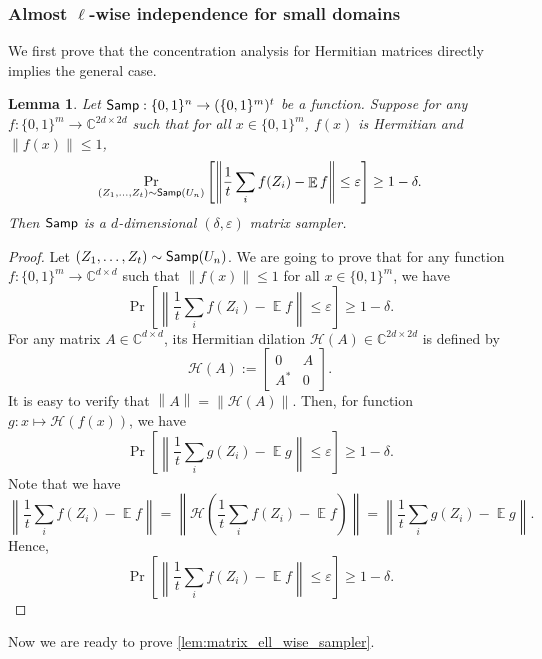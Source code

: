 \documentclass[10pt,a4paper]{article}
\newtheorem{lemma}[theorem]{Lemma}
\newcommand{\C}{\mathbb{C}}
\DeclareMathOperator*{\E}{\mathbb{E}}
\newcommand{\eps}{\varepsilon}
\newcommand{\1}{\mathbbm{1}}
\newcommand{\norm}[1]{\left\lVert #1\right\rVert}
\newcommand{\tuple}[1]{\left(#1\right)}
\newcommand{\zo}{\{0, 1\}}
\newcommand{\Smp}{\textup{\textsf{Samp}}}
\begin{document}
\subsubsection{Almost $\ell$-wise independence for small domains}
We first prove that the concentration analysis for Hermitian matrices directly implies the general case.
\begin{lemma}    \label{lem:Hermitian_implies_general}
    Let $\Smp: \zo^n \to (\zo^m)^t$ be a function. Suppose for any $f: \zo^m \to \C^{2d\times 2d}$ such that for all $x \in \zo^m$, $f(x)$ is Hermitian and $\|f(x)\| \le 1$,     \[
    \Pr_{(Z_1, \dots, Z_t) \sim \Smp(U_n)}
    \left[ \norm{\frac{1}{t}  \sum_i f(Z_i) - \E f} \leq \varepsilon \right]
    \geq 1 - \delta.
    \]
    Then $\Smp$ is a $d$-dimensional $(\delta, \eps)$ matrix sampler.
\end{lemma}

\begin{proof}
    Let $(Z_1, \dots, Z_t) \sim \Smp(U_n)$.
    We are going to prove that for any function $f : \zo^m \to \C^{d \times d}$ such that $\|f(x)\| \leq 1$ for all $x \in \zo^m$, we have
    \[
    \Pr
    \left[ \norm{\frac{1}{t}  \sum_i f(Z_i) - \E f} \leq \varepsilon \right]
    \geq 1 - \delta.
    \]
    For any matrix $A \in \C^{d \times d}$, its Hermitian dilation $\mathcal{H}(A) \in \C^{2d \times 2d}$ is defined by \[
        \mathcal{H}(A) := \begin{bmatrix}
        0 & A \\
        A^* & 0
        \end{bmatrix}.
    \]
    It is easy to verify that $\norm{A} = \norm{\mathcal{H}(A)}$. Then, for function $g : x \mapsto \mathcal{H}(f(x))$, we have
        \[
    \Pr
    \left[ \norm{\frac{1}{t}  \sum_i g(Z_i) - \E g} \leq \varepsilon \right]
    \geq 1 - \delta.
    \]
    Note that we have \[
    \norm{\frac{1}{t}  \sum_i f(Z_i) - \E f} = \norm{\mathcal{H}\tuple{\frac{1}{t}  \sum_i f(Z_i) - \E f}} = \norm{\frac{1}{t}  \sum_i g(Z_i) - \E g}.
    \]
    Hence, \[
        \Pr
    \left[ \norm{\frac{1}{t}  \sum_i f(Z_i) - \E f} \leq \varepsilon \right]
    \geq 1 - \delta.
    \]
\end{proof}

Now we are ready to prove \cref{lem:matrix_ell_wise_sampler}. 
\matrixEllWiseSampler*
\end{document}
